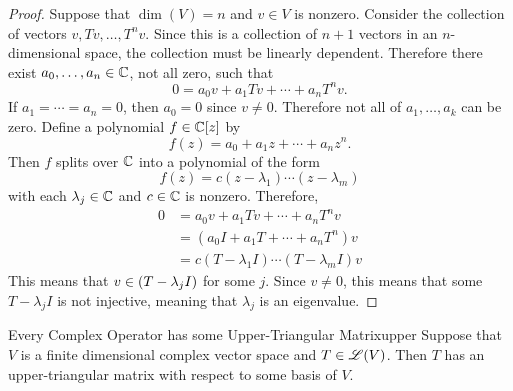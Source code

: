 \documentclass[../../AlgebraQualSolutions.tex]{subfiles}
\begin{document}
\begin{proof}
    Suppose that $\dim(V) = n$ and $v \in V$ is nonzero. Consider the collection of vectors $v, Tv, \ldots, T^nv$. Since this is a collection of $n + 1$ vectors in an $n$-dimensional space, the collection must be linearly dependent. Therefore there exist $a_0,\ldots, a_n \in \mathbb{C}$, not all zero, such that
        \[0 = a_0 v + a_1Tv + \cdots + a_n T^n v.\]
    If $a_1 = \cdots = a_n = 0$, then $a_0 = 0$ since $v \neq 0$. Therefore not all of $a_1,\ldots, a_k$ can be zero. Define a polynomial $f \in \mathbb{C}[z]$ by
        \[f(z) = a_0 + a_1z + \cdots + a_nz^n. \]
    Then $f$ splits over $\mathbb{C}$ into a polynomial of the form
        \[f(z) = c(z- \lambda_1)\cdots (z - \lambda_m) \]
    with each $\lambda_j \in \mathbb{C}$ and $c \in \mathbb{C}$ is nonzero. Therefore,
        \begin{align*}
            0 &= a_0 v + a_1Tv + \cdots + a_n T^n v\\
            &= (a_0I + a_1T + \cdots + a_nT^n)v\\
            &= c(T- \lambda_1I)\cdots (T - \lambda_mI)v
        \end{align*}
    This means that $v \in \null(T - \lambda_j I)$ for some $j$. Since $v \neq 0$, this means that some $T - \lambda_j I$ is not injective, meaning that $\lambda_j$ is an eigenvalue.
\end{proof}

\gap

\begin{prop}{Every Complex Operator has some Upper-Triangular Matrix}{upper}
    Suppose that $V$ is a finite dimensional complex vector space and $T \in \mathscr{L}(V)$. Then $T$ has an upper-triangular matrix with respect to some basis of $V$.
\end{prop}
\end{document}
